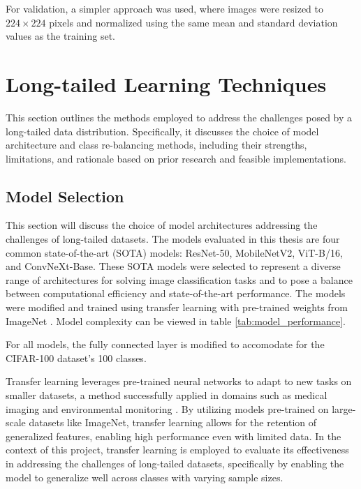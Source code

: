 For validation, a simpler approach was used, where images were resized to $224\times 224$ pixels and normalized using the same mean and standard deviation values as the training set.

\section{Long-tailed Learning Techniques}
This section outlines the methods employed to address the challenges posed by a long-tailed data distribution. Specifically, it discusses the choice of model architecture and class re-balancing methods, including their strengths, limitations, and rationale based on prior research and feasible implementations.  

\subsection{Model Selection}
\label{sec:model_selection}


This section will discuss the choice of model architectures addressing the challenges of long-tailed datasets. The models evaluated in this thesis are four common state-of-the-art (SOTA) models: ResNet-50, MobileNetV2, ViT-B/16, and ConvNeXt-Base. These SOTA models were selected to represent a diverse range of architectures for solving image classification tasks and to pose a balance between computational efficiency and state-of-the-art performance. The models were modified and trained using transfer learning with pre-trained weights from ImageNet \cite{ILSVRC15}. Model complexity can be viewed in table \ref{tab:model_performance}.

For all models, the fully connected layer is modified to accomodate for the CIFAR-100 dataset's 100 classes.

Transfer learning leverages pre-trained neural networks to adapt to new tasks on smaller datasets, a method successfully applied in domains such as medical imaging and environmental monitoring \cite{pan2010,Hinton2006,Fu2021}. By utilizing models pre-trained on large-scale datasets like ImageNet, transfer learning allows for the retention of generalized features, enabling high performance even with limited data. In the context of this project, transfer learning is employed to evaluate its effectiveness in addressing the challenges of long-tailed datasets, specifically by enabling the model to generalize well across classes with varying sample sizes.

